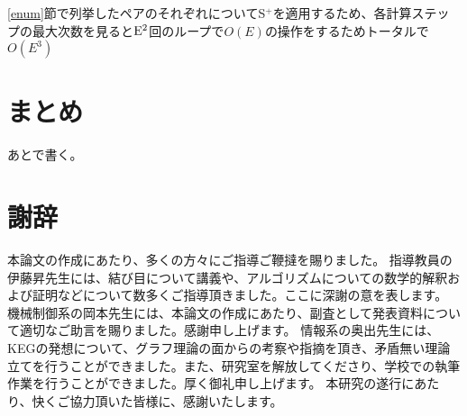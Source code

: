 \documentclass[11pt,a4j]{jarticle}
\newcommand{\splus}{S${}^\text{+}$}
\newcommand{\f}[1]{$\rm{#1}$} %
\begin{document}
\ref{enum}節で列挙したペアのそれぞれについて\splus を適用するため、各計算ステップの最大次数を見ると\f{E^2}回のループで$O(E)$の操作をするためトータルで$O(E^3)$

\section{まとめ}
あとで書く。

\section*{謝辞} %
本論文の作成にあたり、多くの方々にご指導ご鞭撻を賜りました。
指導教員の伊藤昇先生には、結び目について講義や、アルゴリズムについての数学的解釈および証明などについて数多くご指導頂きました。ここに深謝の意を表します。
機械制御系の岡本先生には、本論文の作成にあたり、副査として発表資料について適切なご助言を賜りました。感謝申し上げます。
情報系の奥出先生には、KEGの発想について、グラフ理論の面からの考察や指摘を頂き、矛盾無い理論立てを行うことができました。また、研究室を解放してくださり、学校での執筆作業を行うことができました。厚く御礼申し上げます。
本研究の遂行にあたり、快くご協力頂いた皆様に、感謝いたします。

\end{document}
